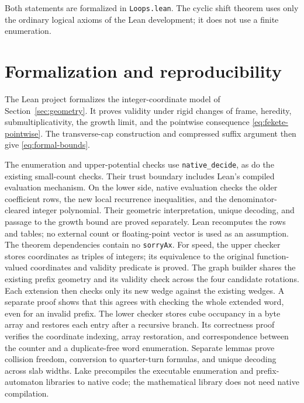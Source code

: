 \documentclass[conference]{IEEEtran}
\begin{document}
Both statements are formalized in \texttt{Loops.lean}. The cyclic
shift theorem uses only the ordinary logical axioms of the Lean
development; it does not use a finite enumeration.

\section{Formalization and reproducibility}\label{sec:reproduce}

The Lean project formalizes the integer-coordinate model of
Section~\ref{sec:geometry}. It proves validity under rigid changes
of frame, heredity, submultiplicativity, the growth limit, and the
pointwise consequence \eqref{eq:fekete-pointwise}.
The transverse-cap construction and compressed suffix argument then
give \eqref{eq:formal-bounds}.

The enumeration and upper-potential checks use \texttt{native\_decide},
as do the existing small-count checks. Their trust boundary includes
Lean's compiled evaluation mechanism. On the lower side, native
evaluation checks the older coefficient rows, the new local recurrence
inequalities, and the denominator-cleared integer polynomial.
Their geometric interpretation, unique decoding, and passage to the
growth bound are proved separately. Lean recomputes the rows and tables;
no external count or floating-point
vector is used as an assumption.
The theorem dependencies contain no \texttt{sorryAx}.
For speed, the upper checker stores coordinates
as triples of integers; its equivalence to the original function-valued
coordinates and validity predicate is proved. The graph builder shares
the existing prefix geometry and its validity check across the four
candidate rotations. Each extension then checks only its new wedge
against the existing wedges. A separate proof shows that this agrees
with checking the whole extended word, even for an invalid prefix.
The lower checker stores cube occupancy in a byte array and restores
each entry after a recursive branch. Its correctness proof verifies
the coordinate indexing, array restoration, and correspondence between
the counter and a duplicate-free word enumeration. Separate lemmas
prove collision freedom, conversion to quarter-turn formulas, and
unique decoding across slab widths.
Lake precompiles the executable enumeration and prefix-automaton libraries
to native code; the mathematical library does not need native compilation.
\end{document}
